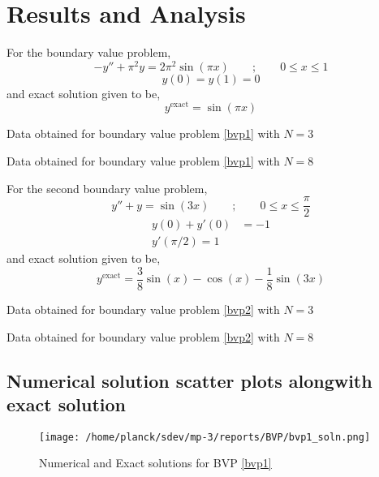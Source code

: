 \documentclass[12pt]{article}
\begin{document}
	\section{Results and Analysis}
	For the boundary value problem,
	\begin{equation}\label{bvp1}
		-y'' + \pi^2 y =2\pi^2\sin(\pi x) \qquad; \qquad 0 \leq x \leq 1
	\end{equation}
	\begin{equation*}\label{bvp1bc}
		y(0) = y(1) = 0
	\end{equation*}
	and exact solution given to be,
	\begin{equation}\label{bvp1exac}
		y^{\text{exact}} = \sin(\pi x)
	\end{equation}
	
	\begin{table}[h]
		\centering
		\caption{Data obtained for boundary value problem \ref{bvp1} with $ N = 3 $}
	\end{table}
	\begin{table}[h]
		\centering
		\caption{Data obtained for boundary value problem \ref{bvp1} with $ N = 8 $}
	\end{table}

	For the second boundary value problem,
	\begin{equation}\label{bvp2}
		y'' + y = \sin(3 x) \qquad; \qquad 0 \leq x \leq \frac{\pi}{2}
	\end{equation}
	\begin{align*}\label{bvp2bc}
		y(0) + y'(0) &= -1\\
		y'(\pi/2) = 1
	\end{align*}
	and exact solution given to be,
	\begin{equation}\label{bvp2exac}
		y^{\text{exact}} = \frac{3}{8}\sin(x) - \cos(x) - \frac{1}{8}\sin(3x)
	\end{equation}
	\begin{table}[H]
		\centering
		\caption{Data obtained for boundary value problem \ref{bvp2} with $ N = 3 $}
	\end{table}
	\begin{table}[H]
		\centering
		\caption{Data obtained for boundary value problem \ref{bvp2} with $ N = 8 $}
	\end{table}
	\subsection{Numerical solution scatter plots alongwith exact solution}
	\begin{figure}[H]
		\centering
		\caption{Numerical and Exact solutions for BVP \ref{bvp1}}
		\texttt{[image: /home/planck/sdev/mp-3/reports/BVP/bvp1\_soln.png]}
	\end{figure}
\end{document}
